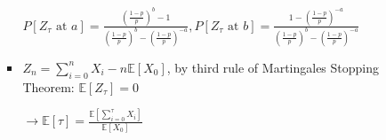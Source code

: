 \documentclass[a4paper]{article}
\begin{document}
\begin{itemize}
\begin{itemize}
\begin{itemize}
                        $P[Z_\tau \text{ at }a ] = \frac{(\frac{1-p}{p})^{b}-1}{(\frac{1-p}{p})^b - (\frac{1-p}{p})^{-a}}, P[Z_\tau \text{ at }b ] = \frac{1-(\frac{1-p}{p})^{-a}}{(\frac{1-p}{p})^b - (\frac{1-p}{p})^{-a}}$
                    \item $Z_n = \sum_{i=0}^n X_i - n \mathbb{E}[X_0]$, by third rule of Martingales Stopping Theorem: $\mathbb{E}[Z_\tau] = 0$

                        $\rightarrow \mathbb{E}[\tau] = \frac{\mathbb{E}[\sum_{i=0}^\tau X_i]}{\mathbb{E}[X_0]}$
                \end{itemize}
        \end{itemize}
\end{itemize}
\end{document}
